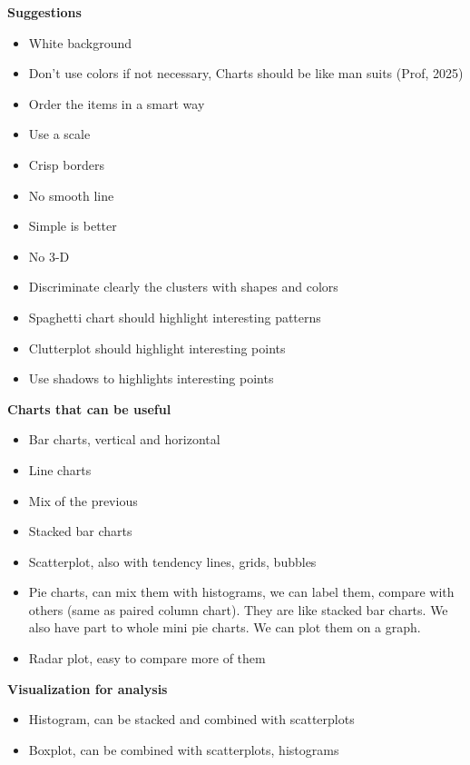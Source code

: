 \newpage

\textbf{Suggestions}

\begin{itemize}
    \item White background
    \item Don't use colors if not necessary, Charts should be like man suits (Prof, 2025)
    \item Order the items in a smart way
    \item Use a scale
    \item Crisp borders
    \item No smooth line
    \item Simple is better
    \item No 3-D
    \item Discriminate clearly the clusters with shapes and colors
    \item Spaghetti chart should highlight interesting patterns
    \item Clutterplot should highlight interesting points
    \item Use shadows to highlights interesting points
\end{itemize}

\vspace{10pt}

\textbf{Charts that can be useful}

\begin{itemize}
    \item Bar charts, vertical and horizontal
    \item Line charts
    \item Mix of the previous
    \item Stacked bar charts
    \item Scatterplot, also with tendency lines, grids, bubbles
    \item Pie charts, can mix them with histograms, we can label them, compare with others (same as paired column chart). They are like stacked bar charts. We also have part to whole mini pie charts. We can plot them on a graph.
    \item  Radar plot, easy to compare more of them
\end{itemize}

\vspace{10pt}

\textbf{Visualization for analysis}


\begin{itemize}
    \item Histogram, can be stacked and combined with scatterplots
    \item Boxplot, can be combined with scatterplots, histograms
\end{itemize}

